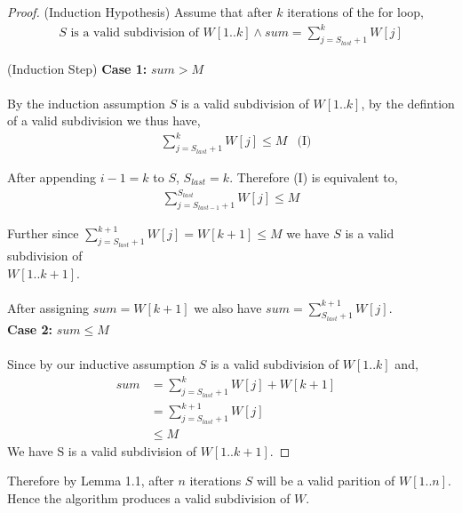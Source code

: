 \documentclass[12pt]{article}
\newenvironment{lemma}[2][Lemma]{\begin{trivlist}
\item[\hskip \labelsep {\bfseries #1}\hskip \labelsep {\bfseries #2.}]}{\end{trivlist}}
\newenvironment{question}[2][Question]{\begin{trivlist}
\item[\hskip \labelsep {\bfseries #1}\hskip \labelsep {\bfseries #2.}]}{\end{trivlist}}
\begin{document}
\begin{question}{1 (a)}
\begin{lemma}{1.1}
\begin{proof}
      (Induction Hypothesis) Assume that after $k$ iterations of the for loop,
      \begin{align*}
        S \text{ is a valid subdivision of } W[1..k] \land sum = \sum_{j = S_{last} + 1}^{k} W[j]
      \end{align*}

      (Induction Step)
      \textbf{Case 1:} $sum > M$ \\ \\
      By the induction assumption $S$ is a valid subdivision of $W[1..k]$, by the defintion of
      a valid subdivision we thus have,
      \begin{align*}
        & \sum_{j = S_{last} + 1}^{k} W[j] \leq M & \text{(I)}
      \end{align*}

      After appending $i - 1 = k$ to $S$, $S_{last} = k$.  Therefore (I) is equivalent to,
      \begin{align*}
        \sum_{j = S_{last - 1} + 1}^{S_{last}} W[j] \leq M
      \end{align*}

      Further since $\sum_{j = S_{last} + 1}^{k+1} W[j] = W[k+1] \leq M$ we have
      $S$ is a valid subdivision of \\
      $W[1..k+1]$. \\ \\
      After assigning $sum = W[k + 1]$ we also have $sum = \sum_{S_{last} +1}^{k+1} W[j]$. \\

      \textbf{Case 2:} $sum \leq M$ \\ \\
      Since by our inductive assumption $S$ is a valid subdivision of $W[1..k]$ and,
      \begin{align*}
        sum & = \sum_{j=S_{last} + 1}^{k} W[j] + W[k+1] & \\
            & = \sum_{j=S_{last} + 1}^{k+1} W[j] & \\
            & \leq M &
      \end{align*}
      We have S is a valid subdivision of $W[1..k+1]$.
    \end{proof}

    Therefore by Lemma 1.1, after $n$ iterations $S$ will be a valid parition of
    $W[1..n]$. \\
    Hence the algorithm produces a valid subdivision of $W$.
  \end{lemma}


\end{question}
\end{document}
